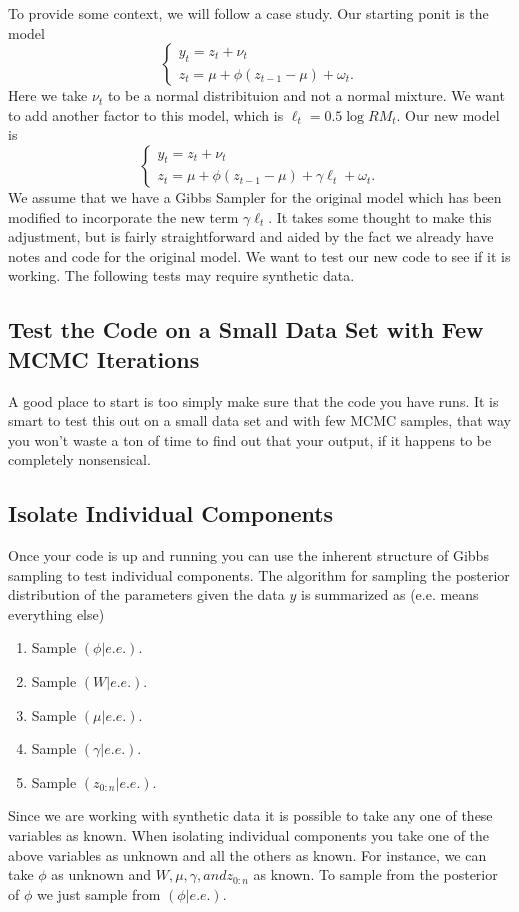 \documentclass{article}
\begin{document}
To provide some context, we will follow a case study.  Our starting ponit is the model
\[
\begin{cases}
y_t = z_t + \nu_t \\
z_t = \mu + \phi (z_{t-1} - \mu) + \omega_t.
\end{cases}
\]
Here we take $\nu_t$ to be a normal distribituion and not a normal mixture.
We want to add another factor to this model, which is $\ell_t = 0.5 \log RM_t$.  Our new model is
\[
\begin{cases}
y_t = z_t + \nu_t \\
z_t = \mu + \phi (z_{t-1} - \mu) + \gamma \ell_t + \omega_t.
\end{cases}
\]
We assume that we have a Gibbs Sampler for the original model which has been modified to incorporate the new term $\gamma \ell_t$.  It takes some thought to make this adjustment, but is fairly straightforward and aided by the fact we already have notes and code for the original model.  We want to test our new code to see if it is working.  The following tests may require synthetic data.

\subsection{Test the Code on a Small Data Set with Few MCMC Iterations}

A good place to start is too simply make sure that the code you have runs.  It is smart to test this out on a small data set and with few MCMC samples, that way you won't waste a ton of time to find out that your output, if it happens to be completely nonsensical.

\subsection{Isolate Individual Components}

Once your code is up and running you can use the inherent structure of Gibbs sampling to test individual components.  The algorithm for sampling the posterior distribution of the parameters given the data $y$ is summarized as (e.e. means everything else)
\begin{enumerate}
\item Sample $(\phi | e.e.)$.
\item Sample $(W | e.e.)$.
\item Sample $(\mu | e.e.)$.
\item Sample $(\gamma | e.e.)$.
\item Sample $(z_{0:n} | e.e.)$.
\end{enumerate}
Since we are working with synthetic data it is possible to take any one of these variables as known.  When isolating individual components you take one of the above variables as unknown and all the others as known.  For instance, we can take $\phi$ as unknown and $W, \mu, \gamma, and z_{0:n}$ as known.  To sample from the posterior of $\phi$ we just sample from $(\phi | e.e.)$.
\end{document}

